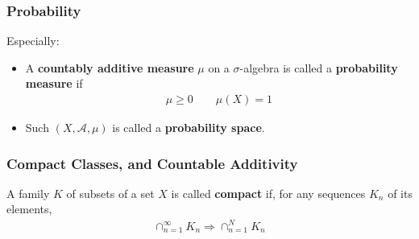 \documentclass[Total.tex]{subfiles}
\begin{document}
			
			\subsubsection{Probability}
			
			Especially: 
			
			\begin{Def}
				\begin{itemize}
					\item A \textbf{countably additive measure} $\mu$ on a $\sigma$-algebra is called a \textbf{probability measure} if
					\begin{gather*}
						\mu\geq 0\qquad \mu(X)=1
					\end{gather*}
					
					\item Such $(X,\mathcal{A},\mu)$ is called a \textbf{probability space}.
				\end{itemize}
			\end{Def}
			\subsubsection{Compact Classes, and Countable Additivity}
			\begin{Def}
				A family $K$ of subsets of a set $X$ is called \textbf{compact} if, for any sequences $K_n$ of its elements, 
				\begin{gather*}
					\cap_{n=1}^\infty K_n\Rightarrow \cap_{n=1}^N K_n
				\end{gather*}
			\end{Def}
			
\end{document}

